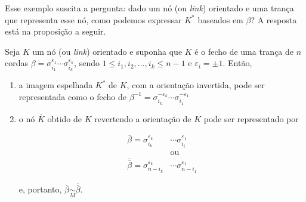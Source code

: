 	\par\vspace{0.3cm} Esse exemplo suscita a pergunta: dado um nó (ou \textit{link}) orientado e uma trança que representa esse nó, como podemos expressar $K^\ast$ baseados em $\beta$? A resposta está na proposição a seguir.
	
	\begin{prop}
		\label{representacao no espelhado}
		Seja $K$ um nó (ou \textit{link}) orientado e suponha que $K$ é o fecho de uma trança de $n$ cordas $\beta = \sigma_{i_1}^{\varepsilon_1}\cdots\sigma_{i_k}^{\varepsilon_k}$, sendo $1\leq i_1, i_2, \dots, i_k\leq n-1$ e $\varepsilon_i=\pm1$. Então, 
		\begin{enumerate}
			\item a imagem espelhada $K^\ast$ de $K$, com a orientação invertida, pode ser representada como o fecho de 
			$\beta^{-1}  = \sigma_{i_k}^{-\varepsilon_{k}}\cdots\sigma_{i_1}^{-\varepsilon_1}$ 
			\item o nó $\overline{K}$ obtido de $K$ revertendo a orientação de $K$ pode ser representado por
			
			\begin{align*}
			\overline{\beta} = \sigma_{i_k}^{\varepsilon_k}&\cdots\sigma_{i_i}^{\varepsilon_1} \\
			&\text{ou} \\
			\overline{\overline{\beta}} = \sigma_{n-i_k}^{\varepsilon_k}&\cdots\sigma_{n - i_1}^{\varepsilon_1}
			\end{align*}
			\par\vspace{0.3cm} e, portanto, $\overline{\beta}\underset{M}{\sim}\overline{\overline{\beta}}$. 
		\end{enumerate}
	\end{prop}
	
